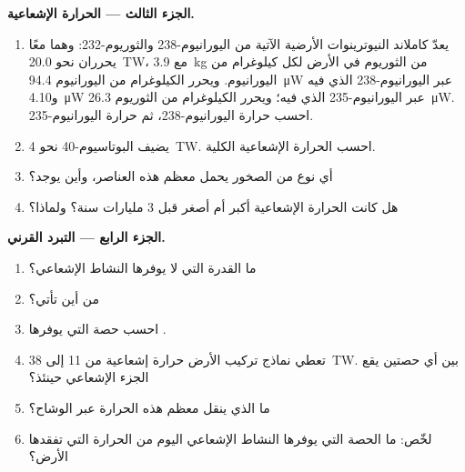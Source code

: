 \begin{problem}
\medskip
\noindent\textbf{الجزء الثالث --- الحرارة الإشعاعية.}
\begin{enumerate}[resume]
  \item يعدّ كاملاند النيوترينوات الأرضية الآتية من اليورانيوم-238 والثوريوم-232: وهما معًا
        يحرران نحو \qty{20.0}{TW}، مع \qty{3.9}{kg} من الثوريوم في
        الأرض لكل كيلوغرام من اليورانيوم. ويحرر الكيلوغرام من اليورانيوم
        \qty{94.4}{\micro W} عبر اليورانيوم-238 الذي فيه و\qty{4.10}{\micro W}
        عبر اليورانيوم-235 الذي فيه؛ ويحرر الكيلوغرام من الثوريوم \qty{26.3}{\micro W}.
        احسب حرارة اليورانيوم-238، ثم حرارة اليورانيوم-235.
  \item يضيف البوتاسيوم-40 نحو \qty{4}{TW}. احسب الحرارة الإشعاعية الكلية.
  \item أي نوع من الصخور يحمل معظم هذه العناصر، وأين يوجد؟
  \item هل كانت الحرارة الإشعاعية أكبر أم أصغر قبل 3 مليارات سنة؟ ولماذا؟
\end{enumerate}

\medskip
\noindent\textbf{الجزء الرابع --- التبرد القرني.}
\begin{enumerate}[resume]
  \item ما القدرة التي لا يوفرها النشاط الإشعاعي؟
  \item من أين تأتي؟
  \item احسب حصة  التي يوفرها .
  \item تعطي نماذج تركيب الأرض حرارة إشعاعية من 11 إلى
        \qty{38}{TW}.
        بين أي حصتين يقع الجزء الإشعاعي حينئذ؟
  \item ما الذي ينقل معظم هذه الحرارة عبر الوشاح؟
  \item لخّص: ما الحصة التي يوفرها النشاط الإشعاعي اليوم من الحرارة التي
        تفقدها الأرض؟
\end{enumerate}
\end{problem}
